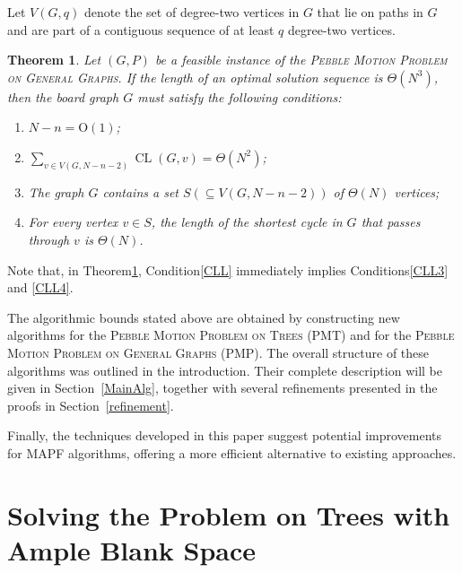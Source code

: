 \documentclass[letter,11pt]{article}
\newtheorem{thm}{Theorem}
\theoremstyle{definition}
\theoremstyle{definition}
\DeclareMathOperator{\CL}{CL}
\newcommand{\1}{\boldmath$~1~$\unboldmath}
\newcommand{\Ord}{\mathrm{O}}
\newcommand{\tume}{\hspace*{0.2em}}
\begin{document}
Let $V(G,q)$ denote the set of degree-two vertices in $G$ that lie on paths 
in $G$ and are part of a contiguous sequence of at least $q$ degree-two vertices.
\begin{thm}\label{Restriction}
Let $(G,P)$ be a feasible instance of the \textsc{Pebble Motion Problem on General Graphs}.
If the length of an optimal solution sequence is $\Theta(N^3)$, then the board graph $G$ must satisfy 
the following conditions:
\begin{enumerate}
\item $N-n=\Ord(1)$;
\item $\displaystyle \sum_{v\in V(G,N-n-2)} \CL(G,v)=\Theta(N^2)$;\label{CLL}
\item The graph $G$ contains a set $S (\subseteq V(G,N-n-2))$ of $\Theta(N)$ vertices;\label{CLL3}
\item For every vertex $v \in S$, the length of the shortest cycle in $G$
      that passes through $v$ is $\Theta(N)$.\label{CLL4}
\end{enumerate}
\end{thm}

\noindent
Note that, in Theorem\tume\ref{Restriction}, Condition\tume\ref{CLL} immediately implies 
Conditions\tume\ref{CLL3} and \ref{CLL4}.

The algorithmic bounds stated above are obtained
by constructing new algorithms for the
\textsc{Pebble Motion Problem on Trees} (PMT)
and for the \textsc{Pebble Motion Problem on General Graphs} (PMP).
The overall structure of these algorithms was outlined
in the introduction.
Their complete description will be given in
Section~\ref{MainAlg}, together with several refinements
presented in the proofs in Section~\ref{refinement}.

Finally, the techniques developed in this paper
suggest potential improvements for MAPF algorithms,
offering a more efficient alternative to existing approaches.


\section{Solving the Problem on Trees with Ample Blank Space}\label{base-cases}

\end{document}
